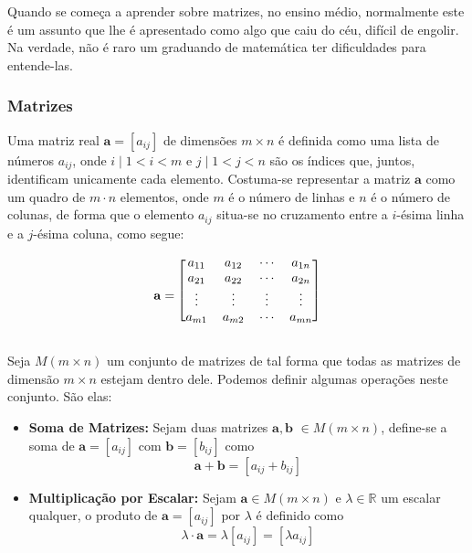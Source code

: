 \documentclass[a4paper,12pt]{article}
\begin{document}
	Quando se começa a aprender sobre matrizes, no ensino médio, normalmente este é um assunto que lhe é apresentado como algo que caiu do céu, difícil de engolir. Na verdade, não é raro um graduando de matemática ter dificuldades para entende-las.
	
	\subsubsection*{Matrizes}
	
	Uma matriz real $\mathbf{a} = [a_{ij}]$ de dimensões $m \times n$ é definida como uma lista de números $a_{ij}$, onde $i \mid 1 < i < m$ e $j \mid 1 < j < n$ são os índices que, juntos, identificam unicamente cada elemento. Costuma-se representar a matriz $\mathbf{a}$ como um quadro de $m\cdot n$ elementos, onde $m$ é o número de linhas e $n$ é o número de colunas, de forma que o elemento $a_{ij}$ situa-se no cruzamento entre a $i$-ésima linha e a $j$-ésima coluna, como segue:
	
	\[ \mathbf{a} =
	\begin{blockarray}{cccc}
	\begin{block}{[cccc]}
	a_{11} & a_{12} & \cdots & a_{1n} \\
	a_{21} & a_{22} & \cdots & a_{2n} \\
	\vdots & \vdots & \vdots & \vdots \\
	a_{m1} & a_{m2} & \cdots & a_{mn} \\
	\end{block}
	\end{blockarray}\]
	
	Seja $M(m\times n)$ um conjunto de matrizes de tal forma que todas as matrizes de dimensão $m\times n$ estejam dentro dele. Podemos definir algumas operações neste conjunto. São elas: 
	
	\begin{itemize}
		\item \textbf{Soma de Matrizes:} Sejam duas matrizes $\mathbf{a}, \mathbf{b}$ $\in M(m \times n)$, define-se a soma de $\mathbf{a} = [a_{ij}]$ com $\mathbf{b} = [b_{ij}]$ como $$\mathbf{a} + \mathbf{b} = [a_{ij} + b_{ij}]$$
		
		\item \textbf{Multiplicação por Escalar:} Sejam $\mathbf{a} \in M(m \times n)$ e $\lambda \in \mathbb{R}$ um escalar qualquer, o produto de $\mathbf{a} = [a_{ij}]$ por $\lambda$ é definido como $$\lambda \cdot \mathbf{a} = \lambda [a_{ij}] = [\lambda a_{ij}]$$
	\end{itemize}
	
\end{document}
